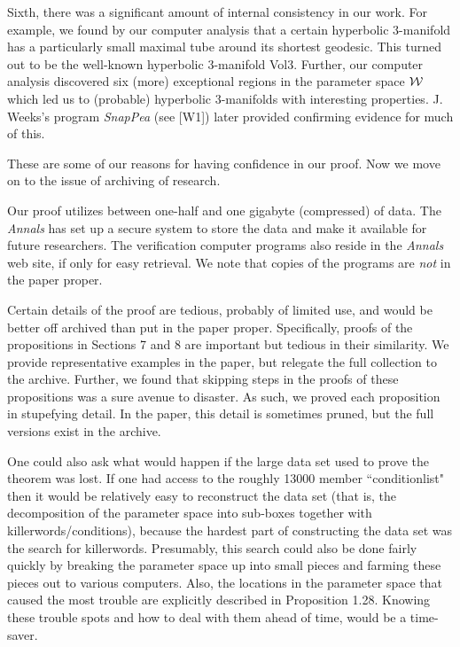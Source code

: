 Sixth, there was a significant amount of internal consistency in our work.  
For example, we found by our computer analysis that a certain hyperbolic\break 
$3$-manifold has  a particularly small maximal tube around its 
shortest geodesic.  This turned out to be the well-known hyperbolic 
$3$-manifold Vol3.  Further, 
our computer analysis discovered six (more) exceptional regions in the 
parameter space ${\cal W}$ which led us to (probable) hyperbolic 
$3$-manifolds with interesting properties.  J. Weeks's program {\it SnapPea} 
(see [W1]) later provided confirming evidence  for much of this.
\pagegoal=48pc
  
These are some of our reasons for having confidence in our proof.  Now we 
move on to the issue of archiving of research.

Our proof utilizes between one-half and one gigabyte (compressed) of data.  
The {\it Annals} has set up a secure system to store the data and make it 
available for future researchers.
The verification computer programs also reside in the {\it Annals} web site, if 
only for easy retrieval.  We note that copies of the programs are {\it not} in 
the paper proper.

Certain details of the proof are tedious, probably of limited use,  and would 
be better off archived than put in the paper proper.  Specifically, proofs of 
the propositions in Sections 7 and 8 are important but tedious in their 
similarity.  We provide representative examples in the paper, but relegate 
the full collection to the archive.  Further,  we found that skipping steps in 
the proofs of these propositions was a sure avenue to disaster.  As such, we 
proved each proposition in stupefying detail.  In the paper, this detail is 
sometimes pruned, but the full versions exist in the archive.

One could also ask what would happen if the large data set used to prove the 
theorem was lost.  
If one had access to the roughly 13000 member ``conditionlist" then it would 
be relatively easy to reconstruct the data set (that is, the decomposition of 
the parameter space into sub-boxes together with killerwords/conditions), 
because the hardest part of constructing the data set was the search for 
killerwords.  Presumably, this search could also be done fairly quickly by 
breaking the parameter space up into small pieces and farming these pieces 
out to various computers.  Also, the locations in the parameter space that 
caused the most trouble are explicitly described in Proposition 1.28.  
Knowing these trouble spots and how to deal with them ahead of time, would 
be a time-saver.

